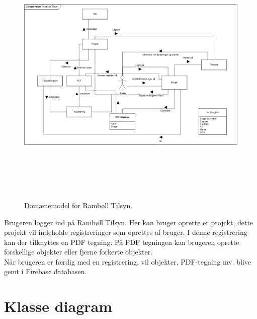 \begin{figure}[H] %
	\centering
	\includegraphics[height=13cm, width=17cm]{../ArkitekturDesign/OverordnetArkitektur/Domainmodel}
	\caption{Domænemodel for Rambøll Tilsyn.}
	\label{fig:Domain}
\end{figure}
Brugeren logger ind på Rambøll Tilsyn. Her kan bruger oprette et projekt, dette projekt vil indeholde registreringer som oprettes af bruger. I denne registrering kan der tilknyttes en PDF tegning. På PDF tegningen kan brugeren oprette forskellige objekter eller fjerne forkerte objekter. \\
Når brugeren er færdig med en registrering, vil objekter, PDF-tegning mv. blive gemt i Firebase databasen.

\clearpage

\section{Klasse diagram}


